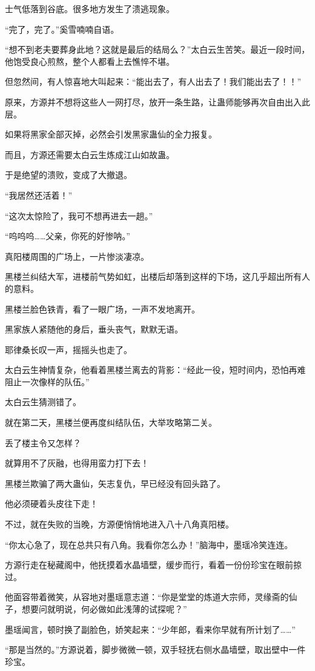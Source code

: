 \begin{this_body}
士气低落到谷底。很多地方发生了溃逃现象。

“完了，完了。”奚雪喃喃自语。

“想不到老夫要葬身此地？这就是最后的结局么？”太白云生苦笑。最近一段时间，他饱受良心煎熬，整个人都看上去憔悴不堪。

但忽然间，有人惊喜地大叫起来：“能出去了，有人出去了！我们能出去了！！”

原来，方源并不想将这些人一网打尽，放开一条生路，让蛊师能够再次自由出入此层。

如果将黑家全部灭掉，必然会引发黑家蛊仙的全力报复。

而且，方源还需要太白云生炼成江山如故蛊。

于是绝望的溃败，变成了大撤退。

“我居然还活着！”

“这次太惊险了，我可不想再进去一趟。”

“呜呜呜……父亲，你死的好惨呐。”

真阳楼周围的广场上，一片惨淡凄凉。

黑楼兰纠结大军，进楼前气势如虹，出楼后却落到这样的下场，这几乎超出所有人的意料。

黑楼兰脸色铁青，看了一眼广场，一声不发地离开。

黑家族人紧随他的身后，垂头丧气，默默无语。

耶律桑长叹一声，摇摇头也走了。

太白云生神情复杂，他看着黑楼兰离去的背影：“经此一役，短时间内，恐怕再难阻止一次像样的队伍。”

太白云生猜测错了。

就在第二天，黑楼兰便再度纠结队伍，大举攻略第二关。

丢了楼主令又怎样？

就算用不了灰融，也得用蛮力打下去！

黑楼兰欺骗了两大蛊仙，矢志复仇，早已经没有回头路了。

他必须硬着头皮往下走！

不过，就在失败的当晚，方源便悄悄地进入八十八角真阳楼。

“你太心急了，现在总共只有八角。我看你怎么办！”脑海中，墨瑶冷笑连连。

方源行走在秘藏阁中，他抚摸着水晶墙壁，缓步而行，看着一份份珍宝在眼前掠过。

他面容带着微笑，从容地对墨瑶意志道：“你是堂堂的炼道大宗师，灵缘斋的仙子，想要问就明说，何必做如此浅薄的试探呢？”

墨瑶闻言，顿时换了副脸色，娇笑起来：“少年郎，看来你早就有所计划了……”

“那是当然的。”方源说着，脚步微微一顿，双手轻抚右侧水晶墙壁，取出壁中一件珍宝。


\end{this_body}
